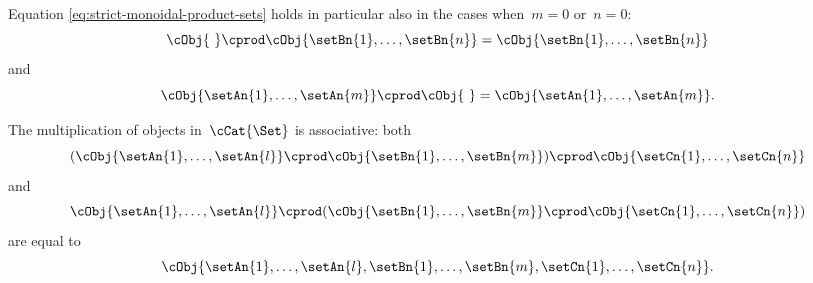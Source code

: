 Equation \cref{eq:strict-monoidal-product-sets} holds in particular also in the cases when~$m = 0$ or~$n =0$:
\begin{equation*}
    \cObj{ \ } \cprod \cObj{\setBn{1}, \ldots, \setBn{n}} = \cObj{\setBn{1}, \ldots, \setBn{n}}
\end{equation*}
and
\begin{equation*}
    \cObj{\setAn{1}, \ldots, \setAn{m}} \cprod \cObj{ \ } = \cObj{\setAn{1}, \ldots, \setAn{m}}.
\end{equation*}

\begin{remark}
    The multiplication of objects in~$\cCat{\Set}$ is associative: both
    \begin{equation*}
        ( \cObj{\setAn{1}, \ldots, \setAn{l}} \cprod \cObj{\setBn{1}, \ldots, \setBn{m}}) \cprod \cObj{\setCn{1}, \ldots, \setCn{n}}
    \end{equation*}
    and
    \begin{equation*}
        \cObj{\setAn{1}, \ldots, \setAn{l}} \cprod (\cObj{\setBn{1}, \ldots, \setBn{m}} \cprod \cObj{\setCn{1}, \ldots, \setCn{n}})
    \end{equation*}
    are equal to
    \begin{equation*}
        \cObj{\setAn{1}, \ldots, \setAn{l}, \setBn{1}, \ldots, \setBn{m}, \setCn{1}, \ldots, \setCn{n}}.
    \end{equation*}
\end{remark}
